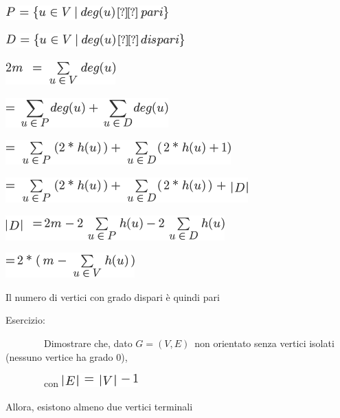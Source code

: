 \documentclass{article}
\begin{document}
\includegraphics{images/image367.png}

\includegraphics{images/image368.png}

{}

\includegraphics{images/image369.png}

\includegraphics{images/image370.png}{~}

\includegraphics{images/image371.png}{~}

\includegraphics{images/image372.png}{~}

{}

\includegraphics{images/image373.png}

\includegraphics{images/image374.png}{~}

{Il numero di vertici con grado dispari è quindi pari}

{}

{Esercizio}{: }

{~~~~~~~~Dimostrare che, dato
}$G=(V,E)${~non orientato senza vertici
isolati (nessuno vertice ha grado 0),}

{~~~~~~~~con }\includegraphics{images/image375.png}

{Allora, esistono almeno due vertici terminali}
\end{document}
